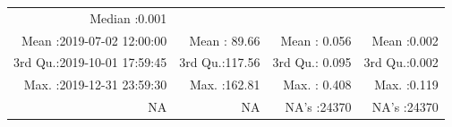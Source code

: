 \documentclass[
  10pt,
  a4paper,oneside]{article}
\begin{document}
\begin{longtable}[]{@{}rrrr@{}}
\begin{minipage}[t]{0.19\columnwidth}
Median :0.001\strut
\end{minipage}\tabularnewline
\begin{minipage}[t]{0.33\columnwidth}\raggedleft
Mean :2019-07-02 12:00:00\strut
\end{minipage} & \begin{minipage}[t]{0.19\columnwidth}\raggedleft
Mean : 89.66\strut
\end{minipage} & \begin{minipage}[t]{0.19\columnwidth}\raggedleft
Mean : 0.056\strut
\end{minipage} & \begin{minipage}[t]{0.19\columnwidth}\raggedleft
Mean :0.002\strut
\end{minipage}\tabularnewline
\begin{minipage}[t]{0.33\columnwidth}\raggedleft
3rd Qu.:2019-10-01 17:59:45\strut
\end{minipage} & \begin{minipage}[t]{0.19\columnwidth}\raggedleft
3rd Qu.:117.56\strut
\end{minipage} & \begin{minipage}[t]{0.19\columnwidth}\raggedleft
3rd Qu.: 0.095\strut
\end{minipage} & \begin{minipage}[t]{0.19\columnwidth}\raggedleft
3rd Qu.:0.002\strut
\end{minipage}\tabularnewline
\begin{minipage}[t]{0.33\columnwidth}\raggedleft
Max. :2019-12-31 23:59:30\strut
\end{minipage} & \begin{minipage}[t]{0.19\columnwidth}\raggedleft
Max. :162.81\strut
\end{minipage} & \begin{minipage}[t]{0.19\columnwidth}\raggedleft
Max. : 0.408\strut
\end{minipage} & \begin{minipage}[t]{0.19\columnwidth}\raggedleft
Max. :0.119\strut
\end{minipage}\tabularnewline
\begin{minipage}[t]{0.33\columnwidth}\raggedleft
NA\strut
\end{minipage} & \begin{minipage}[t]{0.19\columnwidth}\raggedleft
NA\strut
\end{minipage} & \begin{minipage}[t]{0.19\columnwidth}\raggedleft
NA's :24370\strut
\end{minipage} & \begin{minipage}[t]{0.19\columnwidth}\raggedleft
NA's :24370\strut
\end{minipage}\tabularnewline
\bottomrule
\end{longtable}
\end{document}
